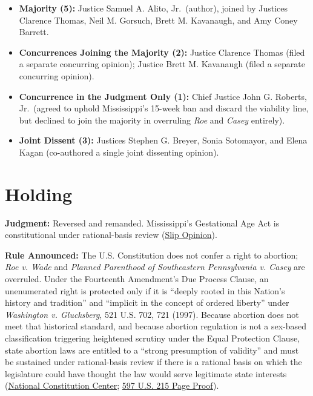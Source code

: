 \documentclass[12pt]{article}
\begin{document}
\begin{itemize}
  \item \textbf{Majority (5):} Justice Samuel A. Alito, Jr.\ (author), joined by Justices Clarence Thomas, Neil M. Gorsuch, Brett M. Kavanaugh, and Amy Coney Barrett.
  \item \textbf{Concurrences Joining the Majority (2):} Justice Clarence Thomas (filed a separate concurring opinion); Justice Brett M. Kavanaugh (filed a separate concurring opinion).
  \item \textbf{Concurrence in the Judgment Only (1):} Chief Justice John G. Roberts, Jr.\ (agreed to uphold Mississippi's 15-week ban and discard the viability line, but declined to join the majority in overruling \textit{Roe} and \textit{Casey} entirely).
  \item \textbf{Joint Dissent (3):} Justices Stephen G. Breyer, Sonia Sotomayor, and Elena Kagan (co-authored a single joint dissenting opinion).
\end{itemize}

\section{Holding}

\textbf{Judgment:} Reversed and remanded. Mississippi's Gestational Age Act is constitutional under rational-basis review (\href{https://www.supremecourt.gov/opinions/21pdf/19-1392_6j37.pdf}{Slip Opinion}).

\textbf{Rule Announced:} The U.S. Constitution does not confer a right to abortion; \textit{Roe v. Wade} and \textit{Planned Parenthood of Southeastern Pennsylvania v. Casey} are overruled. Under the Fourteenth Amendment's Due Process Clause, an unenumerated right is protected only if it is ``deeply rooted in this Nation's history and tradition'' and ``implicit in the concept of ordered liberty'' under \textit{Washington v. Glucksberg}, 521 U.S. 702, 721 (1997). Because abortion does not meet that historical standard, and because abortion regulation is not a sex-based classification triggering heightened scrutiny under the Equal Protection Clause, state abortion laws are entitled to a ``strong presumption of validity'' and must be sustained under rational-basis review if there is a rational basis on which the legislature could have thought the law would serve legitimate state interests (\href{https://constitutioncenter.org/the-constitution/supreme-court-case-library/dobbs-v-jackson-womens-health-organization}{National Constitution Center}; \href{https://www.supremecourt.gov/opinions/21pdf/597us1r58_gebh.pdf}{597 U.S. 215 Page Proof}).
\end{document}
